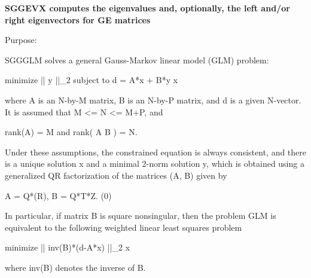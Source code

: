 {\bfseries  S\+G\+G\+E\+V\+X computes the eigenvalues and, optionally, the left and/or right eigenvectors for G\+E matrices} 

 \begin{DoxyParagraph}{Purpose\+: }
\begin{DoxyVerb} SGGGLM solves a general Gauss-Markov linear model (GLM) problem:

         minimize || y ||_2   subject to   d = A*x + B*y
             x

 where A is an N-by-M matrix, B is an N-by-P matrix, and d is a
 given N-vector. It is assumed that M <= N <= M+P, and

            rank(A) = M    and    rank( A B ) = N.

 Under these assumptions, the constrained equation is always
 consistent, and there is a unique solution x and a minimal 2-norm
 solution y, which is obtained using a generalized QR factorization
 of the matrices (A, B) given by

    A = Q*(R),   B = Q*T*Z.
          (0)

 In particular, if matrix B is square nonsingular, then the problem
 GLM is equivalent to the following weighted linear least squares
 problem

              minimize || inv(B)*(d-A*x) ||_2
                  x

 where inv(B) denotes the inverse of B.\end{DoxyVerb}
 
\end{DoxyParagraph}

